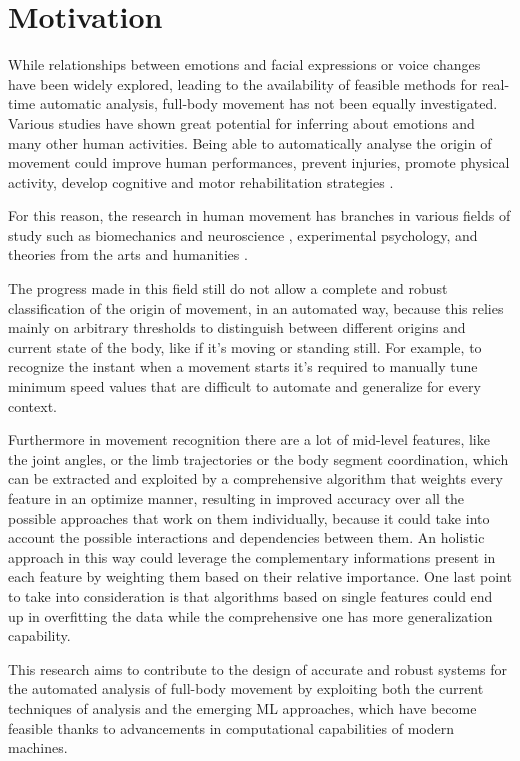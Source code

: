 \chapter{Motivation}

While relationships between emotions and facial expressions or voice changes have been widely explored, 
leading to the availability of feasible methods for real-time automatic analysis, 
full-body movement has not been equally investigated. 
Various studies have shown great potential for inferring about emotions and many other human activities. 
Being able to automatically analyse the origin of movement could improve human performances, 
prevent injuries, promote physical activity, develop cognitive and motor rehabilitation strategies \cite{piana:2016}. 

For this reason, the research in human movement has branches in various fields of study such as biomechanics and neuroscience \cite{vaessen:2019}, 
experimental psychology, and theories from the arts and humanities \cite{camurri:2016}. 

The progress made in this field still do not allow a complete and robust classification of the origin of movement, in an automated way, 
because this relies mainly on arbitrary thresholds to distinguish between different origins and current state of the body, 
like if it’s moving or standing still. 
For example, to recognize the instant when a movement starts it’s required to manually tune 
minimum speed values that are difficult to automate and generalize for every context. 

Furthermore in movement recognition there are a lot of mid-level features, like the joint angles, 
or the limb trajectories or the body segment coordination, which can be extracted and exploited by a comprehensive algorithm 
that weights every feature in an optimize manner, resulting in improved accuracy over all the possible approaches 
that work on them individually, because it could take into account the possible interactions and dependencies between them. 
An holistic approach in this way could leverage the complementary informations present in each feature by weighting them 
based on their relative importance. 
One last point to take into consideration is that algorithms based on single features could end up in overfitting the data
while the comprehensive one has more generalization capability. 

This research aims to contribute to the design of accurate and robust systems for the automated analysis of full-body movement
by exploiting both the current techniques of analysis and the emerging ML approaches, 
which have become feasible thanks to advancements in computational capabilities of modern machines. 